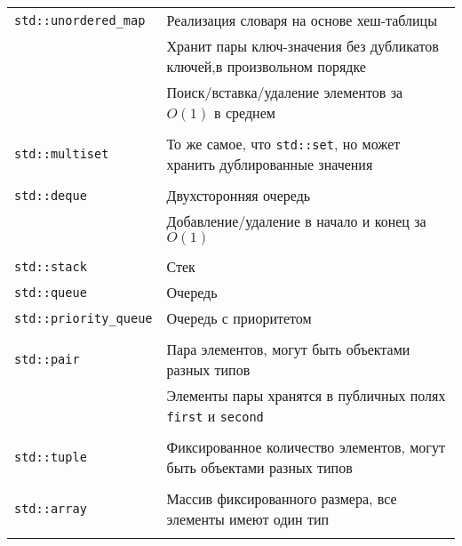 \documentclass{article}
\begin{document}
\begin{center}
\begin{tabular}{ l | l }
 \texttt{std::unordered\_map} & Реализация словаря на основе хеш-таблицы \\
				   & Хранит пары ключ-значения без дубликатов ключей,в произвольном порядке\\
                   & Поиск/вставка/удаление элементов за $O(1)$ в среднем  \\ \\ \hline
 \texttt{std::multiset} & То же самое, что \texttt{std::set}, но может хранить дублированные значения \\ \\ \hline
 \texttt{std::deque} & Двухсторонняя очередь \\
				     & Добавление/удаление в начало и конец за $O(1)$\\ \\  \hline
 \texttt{std::stack} & Стек \\
 \texttt{std::queue} & Очередь \\
 \texttt{std::priority\_queue} & Очередь с приоритетом \\ \\ \hline
 
 \texttt{std::pair} &  Пара элементов, могут быть объектами разных типов \\
                      & Элементы пары хранятся в публичных полях \texttt{first} и \texttt{second} \\ \\ \hline
 \texttt{std::tuple} &  Фиксированное количество элементов, могут быть объектами разных типов \\ \\ \hline
 \texttt{std::array} &  Массив фиксированного размера, все элементы имеют один тип \\ \\ \hline
\end{tabular}
\end{center}


\newpage
\end{document}

